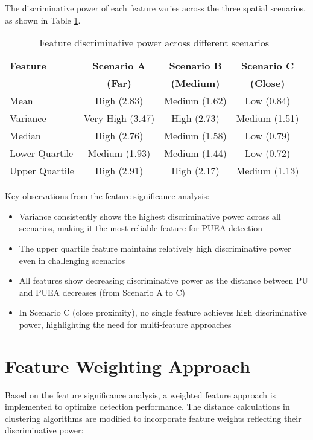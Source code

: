 The discriminative power of each feature varies across the three spatial scenarios, as shown in Table \ref{tab:feature_importance}.

\begin{table}[htbp]
    \centering
    \caption{Feature discriminative power across different scenarios}
    \label{tab:feature_importance}
    \begin{tabular}{lccc}
        \toprule
        \textbf{Feature} & \textbf{Scenario A} & \textbf{Scenario B} & \textbf{Scenario C} \\
        & \textbf{(Far)} & \textbf{(Medium)} & \textbf{(Close)} \\
        \midrule
        Mean & High (2.83) & Medium (1.62) & Low (0.84) \\
        Variance & Very High (3.47) & High (2.73) & Medium (1.51) \\
        Median & High (2.76) & Medium (1.58) & Low (0.79) \\
        Lower Quartile & Medium (1.93) & Medium (1.44) & Low (0.72) \\
        Upper Quartile & High (2.91) & High (2.17) & Medium (1.13) \\
        \bottomrule
    \end{tabular}
\end{table}

Key observations from the feature significance analysis:

\begin{itemize}
    \item Variance consistently shows the highest discriminative power across all scenarios, making it the most reliable feature for PUEA detection
    \item The upper quartile feature maintains relatively high discriminative power even in challenging scenarios
    \item All features show decreasing discriminative power as the distance between PU and PUEA decreases (from Scenario A to C)
    \item In Scenario C (close proximity), no single feature achieves high discriminative power, highlighting the need for multi-feature approaches
\end{itemize}

\section{Feature Weighting Approach}

Based on the feature significance analysis, a weighted feature approach is implemented to optimize detection performance. The distance calculations in clustering algorithms are modified to incorporate feature weights reflecting their discriminative power:

